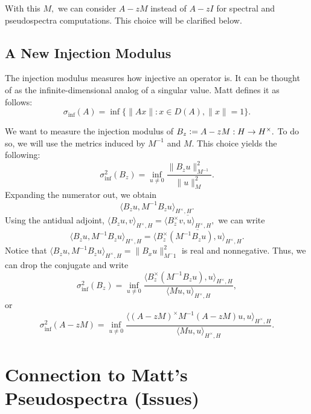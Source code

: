 \documentclass[12pt,a4paper]{article}
\newcommand{\defeq}{\vcentcolon=}
\theoremstyle{boldthm}
\theoremstyle{bolddefn}
\begin{document}
With this $M,$ we can consider $A-zM$ instead of $A-zI$ for spectral and pseudospectra computations. This choice will be clarified below. 

\subsection{A New Injection Modulus}
The injection modulus measures how injective an operator is. It can be thought of as the infinite-dimensional analog of a singular value. Matt defines it as follows:
\begin{equation}
    \sigma_{\inf}(A) = \inf \{ \|Ax\| : x \in D(A), \|x\| = 1 \}.
\end{equation}

We want to measure the injection modulus of $B_z \defeq A - zM : H \rightarrow H^{\times}.$ To do so, we will use the metrics induced by $M^{-1}$ and $M.$ This choice yields the following:
\begin{equation}
    \sigma_{\inf}^2(B_z) = \inf_{u \ne 0} \frac{ \|B_z u \|_{M^{-1}}^2}{\|u\|_{M}^2}.
\end{equation}
Expanding the numerator out, we obtain
\begin{equation}
    \langle B_z u, M^{-1} B_z u \rangle_{H^{\times}, H}.
\end{equation}
Using the antidual adjoint, $\langle B_z u, v \rangle_{H^{\times}, H} = \overline{ \langle B_z^{\times} v, u \rangle_{H^{\times}, H}},$ we can write
\begin{equation}
    \langle B_z u, M^{-1} B_z u \rangle_{H^{\times}, H} = \overline {\langle B_z^{\times} (M^{-1} B_z u), u \rangle_{H^{\times}, H}} .
\end{equation}
Notice that $\langle B_z u, M^{-1} B_z u \rangle_{H^{\times}, H} = \| B_xu\|_{M^-1}^2$ is real and nonnegative. Thus, we can drop the conjugate and write
\begin{equation}
    \sigma_{\inf}^2(B_z) = \inf_{u \ne 0} \frac{{\langle B_z^{\times} (M^{-1} B_z u), u \rangle_{H^{\times}, H}}}{{\langle Mu, u \rangle_{H^{\times}, H}}},
\end{equation}
or
\begin{equation}
    \sigma_{\inf}^2(A-zM) = \inf_{u \ne 0} \frac{{\langle (A-zM)^{\times} M^{-1} (A-zM) u, u \rangle_{H^{\times}, H}}}{{\langle Mu, u \rangle_{H^{\times}, H}}}.
\end{equation}

\section{Connection to Matt's Pseudospectra (Issues)}
\end{document}

